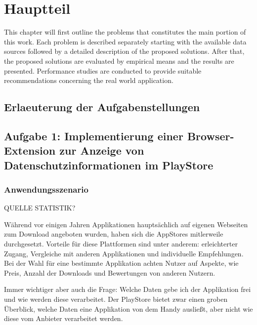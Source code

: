 \chapter{Hauptteil}
\label{c:hauptteil}

This chapter will first outline the problems that constitutes the main portion of this work. Each problem is described separately starting with the available data sources followed by a detailed description of the proposed solutions. After that, the proposed solutions are evaluated by empirical means and the results are presented. Performance studies are conducted to provide suitable recommendations concerning the real world application.



\section{Erlaeuterung der Aufgabenstellungen}
\label{s:erlaeuterungaufgabe}




\section{Aufgabe 1: Implementierung einer Browser-Extension zur Anzeige von Datenschutzinformationen im PlayStore}
\label{s:implementierungextension}

\subsection{Anwendungsszenario}
\label{ss:anwendungsszenario}

QUELLE STATISTIK? 

Während vor einigen Jahren Applikationen hauptsächlich auf eigenen Webseiten zum Download angeboten wurden, haben sich die
AppStores mitlerweile durchgesetzt. Vorteile für diese Plattformen sind unter anderem: erleichterter Zugang, Vergleiche mit anderen Applikationen und individuelle Empfehlungen. Bei der Wahl für eine bestimmte Applikation achten Nutzer auf Aspekte, wie Preis, Anzahl der Downloads und Bewertungen von anderen Nutzern.

Immer wichtiger aber auch die Frage: Welche Daten gebe ich der Applikation frei und wie werden diese verarbeitet. Der PlayStore bietet zwar einen groben Überblick, welche Daten eine Applikation von dem Handy ausließt, aber nicht wie diese vom Anbieter verarbeitet werden.

